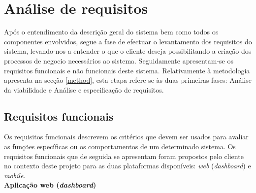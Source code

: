 





\section{Análise de requisitos}
\label{sect:analise}



Após o entendimento da descrição geral do sistema bem como todos os componentes envolvidos, segue a fase de efectuar o levantamento dos requisitos do sistema, levando-nos a entender o que o cliente deseja possibilitando a criação dos processos de negocio necessários ao sistema. Seguidamente apresentam-se os requisitos funcionais e não funcionais deste sistema. Relativamente à metodologia apresenta na secção \ref{method}, esta etapa refere-se às duas primeiras fases: Análise da viabilidade e Análise e especificação de requisitos. 


\subsection{Requisitos funcionais}


Os requisitos funcionais descrevem os critérios que devem ser usados para avaliar as funções específicas ou os comportamentos de um determinado sistema. Os requisitos funcionais que de seguida se apresentam foram propostos pelo cliente no contexto deste projeto para as duas plataformas disponíveis: \textit{web} (\textit{dashboard}) e \textit{mobile}. \\


\textbf{Aplicação web (\textit{dashboard})}


